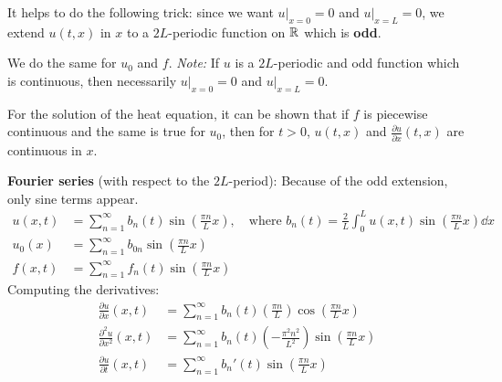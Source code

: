It helps to do the following trick: since we want $u|_{x=0} = 0$ and $u|_{x=L} = 0$, we extend $u(t,x)$ in $x$ to a $2L$-periodic function on $\mathbb{R}$ which is \textbf{odd}.

\begin{center}
\end{center}

We do the same for $u_0$ and $f$. 
\textit{Note:} If $u$ is a $2L$-periodic and odd function which is continuous, then necessarily $u|_{x=0} = 0$ and $u|_{x=L} = 0$.

For the solution of the heat equation, it can be shown that if $f$ is piecewise continuous and the same is true for $u_0$, then for $t > 0$, $u(t,x)$ and $\frac{\partial u}{\partial x}(t,x)$ are continuous in $x$.

\textbf{Fourier series} (with respect to the $2L$-period):
Because of the odd extension, only sine terms appear.
\begin{align*}
    u(x,t) &= \sum_{n=1}^{\infty} b_n(t) \sin\left(\frac{\pi n}{L} x\right), \quad \text{where } b_n(t) = \frac{2}{L} \int_0^L u(x,t) \sin\left(\frac{\pi n}{L} x\right) \dd x \\
    u_0(x) &= \sum_{n=1}^{\infty} b_{0n} \sin\left(\frac{\pi n}{L} x\right) \\
    f(x,t) &= \sum_{n=1}^{\infty} f_n(t) \sin\left(\frac{\pi n}{L} x\right)
\end{align*}
Computing the derivatives:
\begin{align*}
    \frac{\partial u}{\partial x}(x,t) &= \sum_{n=1}^{\infty} b_n(t) \left(\frac{\pi n}{L}\right) \cos\left(\frac{\pi n}{L} x\right) \\
    \frac{\partial^2 u}{\partial x^2}(x,t) &= \sum_{n=1}^{\infty} b_n(t) \left(-\frac{\pi^2 n^2}{L^2}\right) \sin\left(\frac{\pi n}{L} x\right) \\
    \frac{\partial u}{\partial t}(x,t) &= \sum_{n=1}^{\infty} b_n'(t) \sin\left(\frac{\pi n}{L} x\right)
\end{align*}

